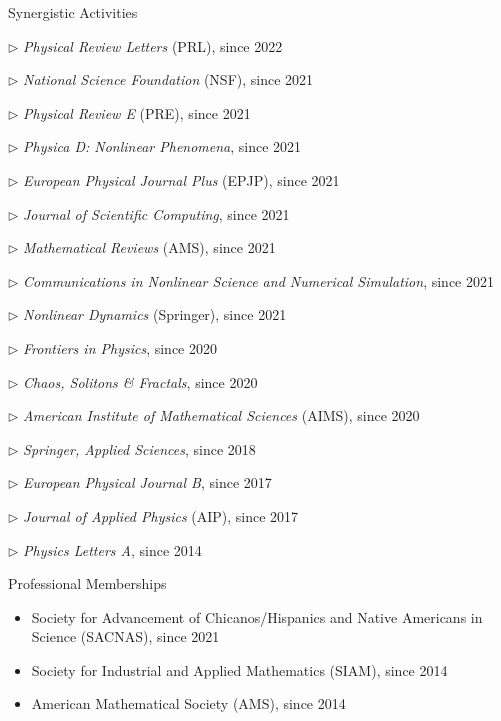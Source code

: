 \documentclass[10pt]{article} %
\newenvironment{outerlist}[1][\enskip\textbullet]%
        {\begin{itemize}[#1]}{\end{itemize}%
         \vspace{-.6\baselineskip}}
\newenvironment{innerlist}[1][\enskip\textbullet]%
        {\begin{compactitem}[#1]}{\end{compactitem}}
\begin{document}
\begin{section}{Synergistic Activities}
\begin{outerlist}
\begin{innerlist}
\item[$\triangleright$] \textit{Physical Review Letters} (PRL), since 2022
\item[$\triangleright$] \textit{National Science Foundation} (NSF), since 2021
\item[$\triangleright$] \textit{Physical Review E} (PRE), since 2021
\item[$\triangleright$] \textit{Physica D: Nonlinear Phenomena}, since 2021
\item[$\triangleright$] \textit{European Physical Journal Plus} (EPJP), since 2021
\item[$\triangleright$] \textit{Journal of Scientific Computing}, since 2021
\item[$\triangleright$] \textit{Mathematical Reviews} (AMS), since 2021 
\item[$\triangleright$] \textit{Communications in Nonlinear Science and Numerical Simulation}, since 2021 
\item[$\triangleright$] \textit{Nonlinear Dynamics} (Springer), since 2021 
\item[$\triangleright$] \textit{Frontiers in Physics}, since 2020
\item[$\triangleright$] \textit{Chaos, Solitons \& Fractals}, since 2020
\item[$\triangleright$] \textit{American Institute of Mathematical Sciences} (AIMS), since 2020
\item[$\triangleright$] \textit{Springer, Applied Sciences}, since 2018
\item[$\triangleright$] \textit{European Physical Journal B}, since 2017
\item[$\triangleright$] \textit{Journal of Applied Physics} (AIP), since 2017
\item[$\triangleright$] \textit{Physics Letters A}, since 2014
\end{innerlist}

\end{outerlist}

\end{section}

\begin{section}{Professional Memberships}
\begin{outerlist}
\item \vskip -7mm
Society for Advancement of Chicanos/Hispanics and Native Americans in Science (SACNAS), since 2021
\item Society for Industrial and Applied Mathematics (SIAM), since 2014
\item American Mathematical Society (AMS), since 2014
\end{outerlist}

\end{section}
\end{document}
